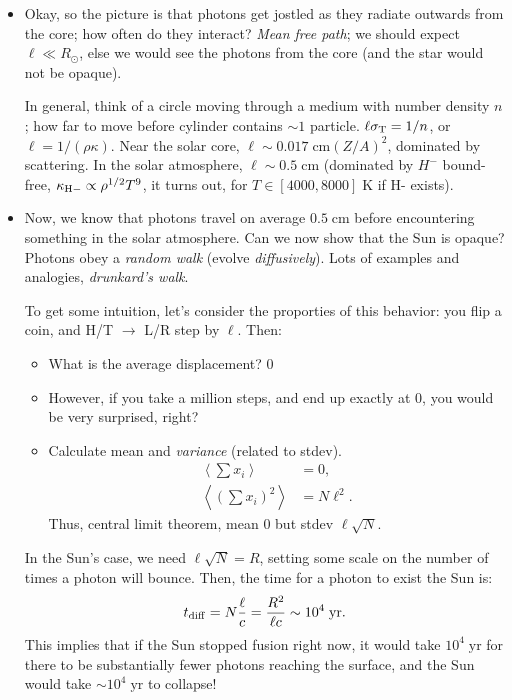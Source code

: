 \documentclass[11pt,
        usenames, %
        dvipsnames %
    ]{article}
\newcommand*{\ev}[1]{\left\langle#1\right\rangle}
\newcommand*{\p}[1]{\left(#1\right)}
\begin{document}
\begin{itemize}
    \item Okay, so the picture is that photons get jostled as they radiate
        outwards from the core; how often do they interact? \emph{Mean free
        path}; we should expect $\ell \ll R_{\odot}$, else we would see the
        photons from the core (and the star would not be opaque).

        In general, think of a circle moving through a medium with number
        density $n$; how far to move before cylinder contains $\sim 1$ particle.
        $\ell \sigma_{\rm T} = 1 / n$, or $\ell = 1 / \p{\rho \kappa}$. Near the
        solar core, $\ell \sim 0.017\;\mathrm{cm}(Z/A)^2$, dominated by
        scattering. In the solar atmosphere, $\ell \sim 0.5\;\mathrm{cm}$
        (dominated by $H^-$ bound-free, $\kappa_{\rm H-}\propto \rho^{1/2}T^9$,
        it turns out, for $T \in [4000, 8000]\;\mathrm{K}$ if H- exists).

    \item Now, we know that photons travel on average $0.5\;\mathrm{cm}$ before
        encountering something in the solar atmosphere. Can we now show that the
        Sun is opaque? Photons obey a \emph{random walk} (evolve
        \emph{diffusively}). Lots of examples and analogies, \emph{drunkard's
        walk}.

        To get some intuition, let's consider the proporties of this behavior:
        you flip a coin, and H/T $\to$ L/R step by $\ell$. Then:
        \begin{itemize}
            \item What is the average displacement? $0$
            \item However, if you take a million steps, and end up exactly at
                $0$, you would be very surprised, right?

            \item Calculate mean and \emph{variance} (related to stdev).
                \begin{align}
                    \ev{\sum\limits x_i} &= 0,\\
                    \ev{(\sum\limits x_i)^2} &= N\ell^2.
                \end{align}
                Thus, central limit theorem, mean $0$ but stdev $\ell \sqrt{N}$.
        \end{itemize}
        In the Sun's case, we need $\ell \sqrt{N} = R$, setting some scale on
        the number of times a photon will bounce. Then, the time for a photon to
        exist the Sun is:
        \begin{align}
            t_{\rm diff} = N\frac{\ell}{c} = \frac{R^2}{\ell c} \sim
                10^4\;\mathrm{yr}.
        \end{align}
        This implies that if the Sun stopped fusion right now, it would take
        $10^4 \;\mathrm{yr}$ for there to be substantially fewer photons
        reaching the surface, and the Sun would take $\sim 10^4\;\mathrm{yr}$ to
        collapse!


\end{itemize}
\end{document}
